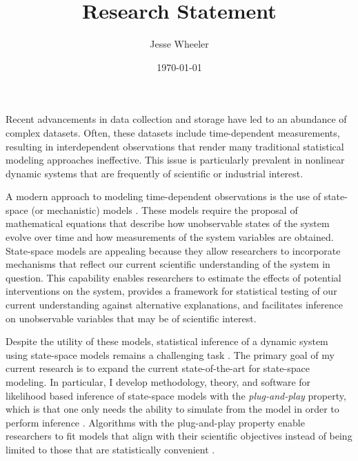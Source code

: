 \documentclass{article}
\title{Research Statement}
\author{Jesse Wheeler}
\date{\today}
\begin{document}
\rule{0mm}{1mm}
\vspace{-20mm}


\vspace{1mm}

\rule{0mm}{1mm}

\vspace{3mm}
\rule{0mm}{1mm}

\vspace{4mm}

\noindent Recent advancements in data collection and storage have led to an abundance of complex datasets.
Often, these datasets include time-dependent measurements, resulting in interdependent observations that render many traditional statistical modeling approaches ineffective.
This issue is particularly prevalent in nonlinear dynamic systems that are frequently of scientific or industrial interest.

A modern approach to modeling time-dependent observations is the use of state-space (or mechanistic) models \cite{durbin12}.
These models require the proposal of mathematical equations that describe how unobservable states of the system evolve over time and how measurements of the system variables are obtained.
State-space models are appealing because they allow researchers to incorporate mechanisms that reflect our current scientific understanding of the system in question.
This capability enables researchers to estimate the effects of potential interventions on the system, provides a framework for statistical testing of our current understanding against alternative explanations, and facilitates inference on unobservable variables that may be of scientific interest.

Despite the utility of these models, statistical inference of a dynamic system using state-space models remains a challenging task \cite{auger16}.
The primary goal of my current research is to expand the current state-of-the-art for state-space modeling.
In particular, I develop methodology, theory, and software for likelihood based inference of state-space models with the {\it plug-and-play} property, which is that one only needs the ability to simulate from the model in order to perform inference \cite{breto09}.
Algorithms with the plug-and-play property enable researchers to fit models that align with their scientific objectives instead of being limited to those that are statistically convenient \cite{wheeler24}.
\end{document}
